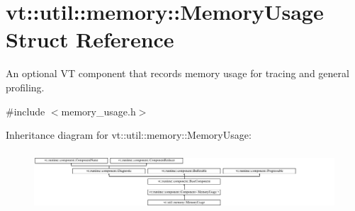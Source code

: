 \hypertarget{structvt_1_1util_1_1memory_1_1_memory_usage}{}\section{vt\+:\+:util\+:\+:memory\+:\+:Memory\+Usage Struct Reference}
\label{structvt_1_1util_1_1memory_1_1_memory_usage}


An optional VT component that records memory usage for tracing and general profiling.  




{\ttfamily \#include $<$memory\+\_\+usage.\+h$>$}

Inheritance diagram for vt\+:\+:util\+:\+:memory\+:\+:Memory\+Usage\+:\begin{figure}[H]
\begin{center}
\leavevmode
\includegraphics[height=2.201258cm]{structvt_1_1util_1_1memory_1_1_memory_usage}
\end{center}
\end{figure}
